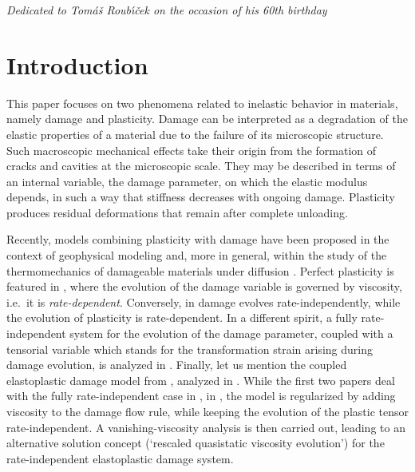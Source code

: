 \documentclass[a4paper,10pt,reqno]{amsart}
\numberwithin{equation}{section}
\numberwithin{equation}{section}
\begin{document}
\centerline{\emph{Dedicated to Tom\'a\v{s} Roub\'{\i}\v{c}ek on the occasion of his 60th birthday}}






\section{\bf Introduction}
\noindent
This paper focuses on two phenomena related to inelastic behavior in materials, namely
damage and plasticity. Damage  can be interpreted as a degradation of  the  elastic
properties of a material due to the failure of its microscopic structure. Such macroscopic mechanical
 effects take
their origin from the formation of cracks and cavities at the microscopic scale. %
They may be described in terms of  an internal variable, the damage parameter,
 on which the elastic modulus depends, in such a way that
  stiffness decreases with ongoing
damage. Plasticity produces residual deformations that remain after complete unloading.
  \par
 Recently,  models combining   plasticity with damage  have been proposed in the context of geophysical modeling
 \cite{Roub-Souc-Vodicka2013,Roub-Valdman2016} and, more in general, within the 
 study of the thermomechanics of damageable materials under diffusion \cite{Roub-Tomassetti}.  Perfect plasticity is featured in \cite{Roub-Souc-Vodicka2013,Roub-Valdman2016}, where the evolution of the damage variable is governed by viscosity, i.e.\ it is \emph{rate-dependent}. 
 Conversely, in \cite{Roub-Tomassetti} damage evolves rate-independently, while the evolution of plasticity is rate-dependent. 
  In a different spirit,   a fully rate-independent system for the evolution of  the damage parameter, coupled with a tensorial variable
  which stands for the trans\-for\-ma\-tion strain arising during damage evolution, is analyzed in 
  \cite{Bonetti-Rocca-Rossi-Thomas16}.
  Finally, let us mention the coupled elastoplastic damage model from \cite{AMV14,AMV15},  analyzed in 
  \cite{Crismale,Crismale16-strgr,Crismale-Lazzaroni}. While the first two papers deal with 
   the fully rate-independent case in \cite{Crismale}, in \cite{Crismale-Lazzaroni},
  the model is regularized by adding viscosity to the damage flow rule, while keeping the evolution of the
  plastic tensor rate-independent. 
   A vanishing-viscosity analysis is then carried out, leading to   an alternative solution concept (`rescaled quasistatic viscosity evolution')
   for the  rate-independent elastoplastic damage system.
\end{document}
